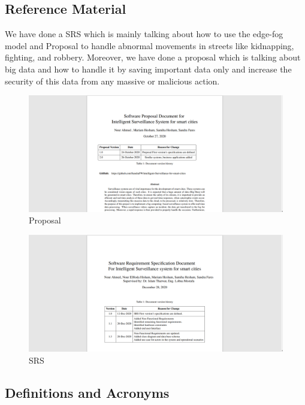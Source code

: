 \documentclass[12pt]{article}
\begin{document}
\subsection{Reference Material}
We have done a  SRS which is mainly talking about how to use the edge-fog model and  Proposal to handle abnormal movements in streets like kidnapping, fighting, and robbery.  Moreover, we have done a proposal which is talking about big data and how to handle it by saving important data only and increase the security of this data from any massive or malicious action.


\begin{figure}[htbp]
\centering
\includegraphics[width=0.9\linewidth]{proposal.png}
\caption{Proposal}
\label{archdsgn}
\end{figure}
\FloatBarrier

\begin{figure}[htbp]
\centering
\includegraphics[width=0.9\linewidth]{SRS.png}
\caption{SRS}
\label{archdsgn}
\end{figure}
\FloatBarrier


\subsection{Definitions and Acronyms}
\end{document}
